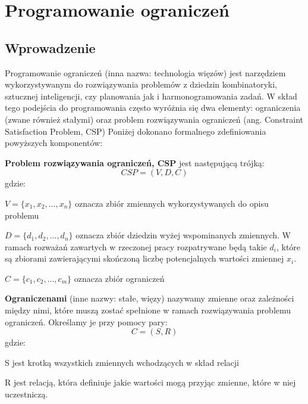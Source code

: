 \chapter{Programowanie ograniczeń}
\thispagestyle{chapterBeginStyle}

\section{Wprowadzenie}
    Programowanie ograniczeń (inna nazwa: technologia więzów) jest narzędziem wykorzystywanym do rozwiązywania 
    problemów z dziedzin kombinatoryki, sztucznej inteligencji, czy planowania jak i harmonogramowania zadań.
    W skład tego podejścia do programowania często wyróżnia się dwa elementy: ograniczenia (zwane również
    stałymi) oraz problem rozwiązywania ograniczeń (ang. Constraint Satisfaction Problem, CSP)
    Poniżej dokonano formalnego zdefiniowania powyższych komponentów:
    \begin{definition}
        \label{ConstraintProblem}
        \textbf{Problem rozwiązywania ograniczeń, CSP} jest następującą trójką:
        \begin{equation}
            CSP = (V,D,C)
        \end{equation}
        gdzie:

        $V = \{x_{1},x_{2},...,x_{n}\}$ oznacza zbiór zmiennych wykorzystywanych do opisu problemu

        $D = \{d_{1},d_{2},...,d_{n}\}$ oznacza zbiór dziedzin wyżej wspominanych zmiennych. W ramach 
        rozważań zawartych w rzeczonej pracy rozpatrywane będą takie $d_{i}$, które są zbiorami zawierającymi 
        skończoną liczbę potencjalnych wartości zmiennej $x_{i}$.

        $C = \{c_{1},c_{2},...,c_{m}\}$ oznacza zbiór ograniczeń
    \end{definition}
    \begin{definition}
        \label{Constraint}
        \textbf{Ograniczenami} (inne nazwy: stałe, więzy) nazywamy zmienne oraz zależności między nimi, które muszą zostać spełnione 
        w ramach rozwiązywania problemu ograniczeń. Określamy je przy pomocy pary: 
        \begin{equation}
            C = (S,R)
        \end{equation}
        gdzie:

        S jest krotką wszystkich zmiennych wchodzących w skład relacji 

        R jest relacją, która definiuje jakie wartości mogą przyjąc zmienne, które w niej uczestniczą.
    \end{definition}
